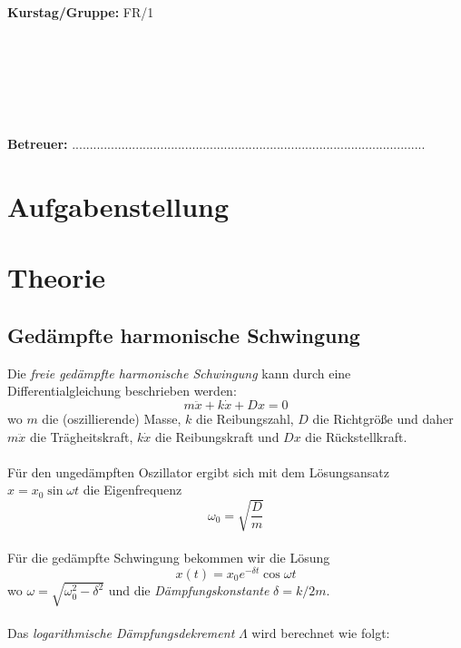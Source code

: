 \documentclass{article}
\begin{document}
\begin{verbatim}


\end{verbatim}
			\begin{flushleft}
			\textbf{\Large{Kurstag/Gruppe:}} \Large{FR/1}
			\end{flushleft}

\begin{verbatim}






\end{verbatim}
			\begin{flushleft}
			\LARGE{\textbf{Betreuer:}}	\Large{....................................................................................................}	
			\end{flushleft}
			
\newpage

\section{Aufgabenstellung}
\section{Theorie}

\subsection{Gedämpfte harmonische Schwingung}

Die \textit{freie gedämpfte harmonische Schwingung} kann durch eine Differentialgleichung beschrieben werden:
\begin{equation}
\label{diffharmonisch}
m\ddot{x}+k\dot{x}+Dx=0
\end{equation}
wo $m$ die (oszillierende) Masse, $k$ die Reibungszahl, $D$ die Richtgröße und daher $m\ddot{x}$ die Trägheitskraft, $k\dot{x}$ die Reibungskraft und $Dx$ die Rückstellkraft.\\
\\
Für den ungedämpften Oszillator ergibt sich mit dem Lösungsansatz $x=x_0\sin \omega t$ die Eigenfrequenz
\begin{equation}
\label{eigenfrequenz}
\omega_0=\sqrt{\frac{D}{m}}
\end{equation}
\\
Für die gedämpfte Schwingung bekommen wir die Lösung
\begin{equation}
\label{gedaempft}
x(t)=x_0 e^{-\delta t}\cos \omega t
\end{equation}
wo $\omega=\sqrt{\omega^2_0 - \delta^2}$ und die \textit{Dämpfungskonstante} $\delta=k/2m$.\\
\\
Das \textit{logarithmische Dämpfungsdekrement} $\Lambda$ wird berechnet wie folgt:
\end{document}
